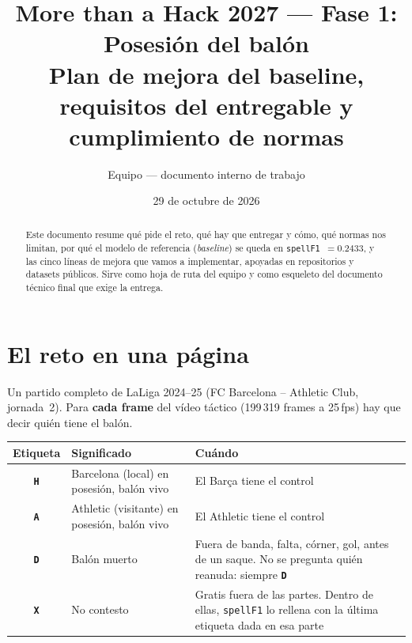 \documentclass[11pt,a4paper]{article}
\title{More than a Hack 2027 --- Fase 1: Posesi\'on del bal\'on\\[4pt]
\large Plan de mejora del baseline, requisitos del entregable y cumplimiento de normas}
\author{Equipo --- documento interno de trabajo}
\date{29 de octubre de 2026}
\newcommand{\lab}[1]{\texttt{\textbf{#1}}}
\begin{document}
\maketitle

\begin{abstract}
Este documento resume qu\'e pide el reto, qu\'e hay que entregar y c\'omo, qu\'e normas nos
limitan, por qu\'e el modelo de referencia (\emph{baseline}) se queda en
\texttt{spellF1}~$=0.2433$, y las cinco l\'ineas de mejora que vamos a implementar, apoyadas
en repositorios y datasets p\'ublicos. Sirve como hoja de ruta del equipo y como esqueleto del
documento t\'ecnico final que exige la entrega.
\end{abstract}

\tableofcontents
\newpage

\section{El reto en una p\'agina}

Un partido completo de LaLiga 2024--25 (FC Barcelona -- Athletic Club, jornada~2). Para
\textbf{cada frame} del v\'ideo t\'actico (199\,319 frames a 25\,fps) hay que decir qui\'en tiene
el bal\'on.

\begin{center}
\begin{tabularx}{\linewidth}{c l L}
\toprule
Etiqueta & Significado & Cu\'ando \\
\midrule
\lab{H} & Barcelona (local) en posesi\'on, bal\'on vivo & El Bar\c{c}a tiene el control \\
\lab{A} & Athletic (visitante) en posesi\'on, bal\'on vivo & El Athletic tiene el control \\
\lab{D} & Bal\'on muerto & Fuera de banda, falta, c\'orner, gol, antes de un saque.
  No se pregunta qui\'en reanuda: siempre \lab{D} \\
\lab{X} & No contesto & Gratis fuera de las partes. Dentro de ellas, \texttt{spellF1} lo
  rellena con la \'ultima etiqueta dada en esa parte \\
\bottomrule
\end{tabularx}
\end{center}
\end{document}
